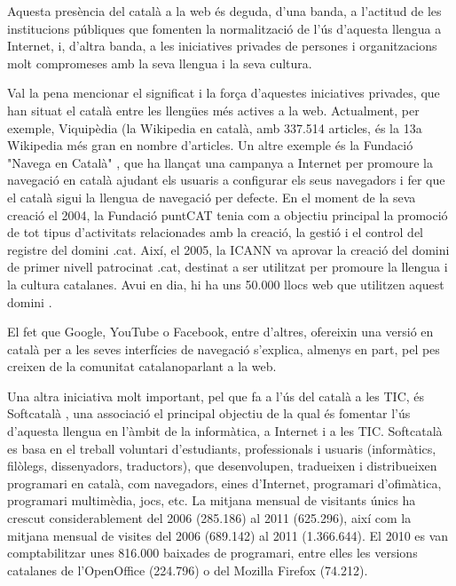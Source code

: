 \begin{multicols}{2}
Aquesta presència del català a la web és deguda, d’una banda, a l’actitud de les institucions públiques que fomenten la normalització de l’ús d’aquesta llengua a Internet, i, d’altra banda, a les iniciatives privades de persones i organitzacions molt compromeses amb la seva llengua i la seva cultura.

Val la pena mencionar el significat i la força d’aquestes iniciatives privades, que han situat el català entre les llengües més actives a la web. Actualment, per exemple, Viquipèdia (la Wikipedia en català, amb 337.514 articles, és la 13a Wikipedia més gran en nombre d’articles. Un altre exemple és la Fundació "Navega en Català" \cite{CAT-Nota19}, que ha llançat una campanya a Internet per promoure la navegació en català ajudant els usuaris a configurar els seus navegadors i fer que el català sigui la llengua de navegació per defecte. En el moment de la seva creació el 2004, la Fundació puntCAT tenia com a objectiu principal la promoció de tot tipus d’activitats relacionades amb la creació, la gestió i el control del registre del domini .cat. Així, el 2005, la ICANN va aprovar la creació del domini de primer nivell patrocinat .cat, destinat a ser utilitzat per promoure la llengua i la cultura catalanes. Avui en dia, hi ha uns 50.000 llocs web que utilitzen aquest domini \cite{CAT-Nota20}.


El fet que Google, YouTube o Facebook, entre d’altres, ofereixin una versió en català per a les seves interfícies de navegació s’explica, almenys en part, pel pes creixen de la comunitat catalanoparlant a la web.

Una altra iniciativa molt important, pel que fa a l’ús del català a les TIC, és Softcatalà \cite{CAT-Nota21}, una associació el principal objectiu de la qual és fomentar l’ús d’aquesta llengua en l’àmbit de la informàtica, a Internet i a les TIC. Softcatalà es basa en el treball voluntari d’estudiants, professionals i usuaris (informàtics, filòlegs, dissenyadors, traductors), que desenvolupen, tradueixen i distribueixen programari en català, com navegadors, eines d’Internet, programari d’ofimàtica, programari multimèdia, jocs, etc. La mitjana mensual de visitants únics ha crescut considerablement del 2006 (285.186) al 2011 (625.296), així com la mitjana mensual de visites del 2006  (689.142) al 2011 (1.366.644). El 2010 es van comptabilitzar unes 816.000 baixades de programari, entre elles les versions catalanes de l’OpenOffice (224.796) o del Mozilla Firefox (74.212).


\end{multicols}
